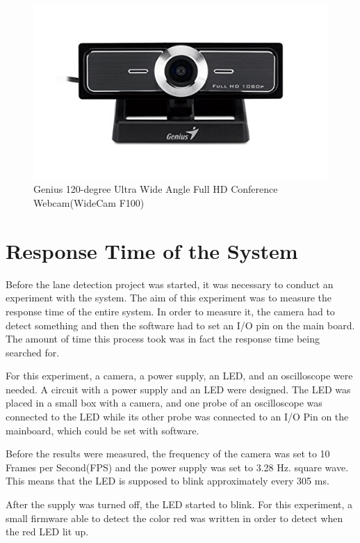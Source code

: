 \begin{figure}[H]
 \centering
  \includegraphics[width=1\textwidth]{./Bilder/Genius_F100_camera.png}	
   \caption{Genius 120-degree Ultra Wide Angle Full HD Conference Webcam(WideCam F100) }
  \label{fig:Genius-Camera}
\end{figure}






\section{Response Time of the System}\label{sec:Response Time of the System}

Before the lane detection project was started, it was necessary to conduct an experiment with the system. The aim of this experiment was to measure the response time of the entire system. In order to measure it, the camera had to detect something and then the software had to set an I/O pin on the main board. The amount of time this process took was in fact the response time being searched for.

For this experiment, a camera, a power supply, an LED, and an oscilloscope were needed. A circuit with a power supply and an LED were designed. The LED was placed in a small box with a camera, and one probe of an oscilloscope was connected to the LED while its other probe was connected to an I/O Pin on the mainboard, which could be set with software.

Before the results were measured, the frequency of the camera was set to 10 Frames per Second(FPS) and the power supply was set to 3.28 Hz. square wave. This means that the LED is supposed to blink approximately every 305 ms.

After the supply was turned off, the LED started to blink. For this experiment, a small firmware able to detect the color red was written in order to detect when the red LED lit up.

